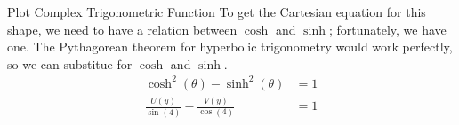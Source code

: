 \begin{example}[Lecture 4]{Plot Complex Trigonometric Function}
  To get the Cartesian equation for this shape, we need to have a relation between $\cosh$ and $\sinh$; fortunately, we have one.
  The Pythagorean theorem for hyperbolic trigonometry would work perfectly, so we can substitue for $\cosh$ and $\sinh$.
  \begin{align*}
    \cosh^{2}(\theta) - \sinh^{2}(\theta) &= 1 \\
    \frac{U(y)}{\sin(4)} - \frac{V(y)}{\cos(4)} &= 1
  \end{align*}
\end{example}

